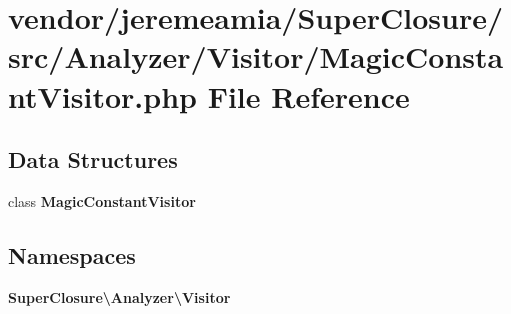 \section{vendor/jeremeamia/\+Super\+Closure/src/\+Analyzer/\+Visitor/\+Magic\+Constant\+Visitor.php File Reference}
\label{_magic_constant_visitor_8php}
\subsection*{Data Structures}
\begin{DoxyCompactItemize}
\item 
class {\bf Magic\+Constant\+Visitor}
\end{DoxyCompactItemize}
\subsection*{Namespaces}
\begin{DoxyCompactItemize}
\item 
 {\bf Super\+Closure\textbackslash{}\+Analyzer\textbackslash{}\+Visitor}
\end{DoxyCompactItemize}
